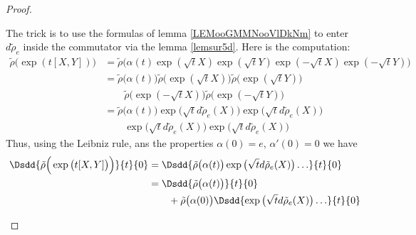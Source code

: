 \begin{proof}
\begin{subproof}
		The trick is to use the formulas of lemma \ref{LEMooGMMNooVlDkNm} to enter \( d\tilde \rho_e\) inside the commutator via the lemma \ref{lemsur5d}. Here is the computation:
		\begin{subequations}
			\begin{align}
				\tilde \rho\big( \exp(t[X,Y]) \big) & =\tilde \rho\Big( \alpha(t)\exp(\sqrt{ t }X)\exp(\sqrt{ t }Y)\exp(-\sqrt{ t }X)\exp(-\sqrt{ t }Y) \Big) \\
				                                    & =\tilde \rho\big( \alpha(t) \big) \tilde \rho\big( \exp(\sqrt{ t }X) \big)
				\tilde \rho\big( \exp(\sqrt{ t }Y) \big)                                                                                                      \\\nonumber
				                                    & \qquad\tilde \rho\big( \exp(-\sqrt{ t }X) \big)
				\tilde \rho\big( \exp(-\sqrt{ t }Y) \big)                                                                                                     \\
				                                    & =\tilde \rho\big(\alpha(t)\big)
				\exp\big( \sqrt{ t }d\tilde \rho_e(X) \big)
				\exp\big( \sqrt{ t }d\tilde \rho_e(X) \big)                                                                                                   \\\nonumber
				                                    & \qquad\exp\big( \sqrt{ t }d\tilde \rho_e(X) \big)
				\exp\big( \sqrt{ t }d\tilde \rho_e(X) \big)
			\end{align}
		\end{subequations}
		Thus, using the Leibniz rule, ans the properties \( \alpha(0)=e\), \( \alpha'(0)=0\) we have
		\begin{subequations}
			\begin{align}
				\Dsdd{ \tilde \rho\Big( \exp\big( t[X,Y] \big) \Big) }{t}{0} & =\Dsdd{  \tilde \rho\big( \alpha(t) \big)\exp\big( \sqrt{ t }d\tilde \rho_e(X) \big)\ldots   }{t}{0}                                           \\
				                                                             & =\Dsdd{ \tilde \rho\big( \alpha(t) \big) }{t}{0}                                                                                               \\\nonumber
				                                                             & \qquad+\tilde \rho\big( \alpha(0) \big)\Dsdd{ \exp\big( \sqrt{ t }d\tilde \rho_e(X) \big)\ldots }{t}{0}                                        \\

\end{align}
\end{subequations}
\end{subproof}
\end{proof}
